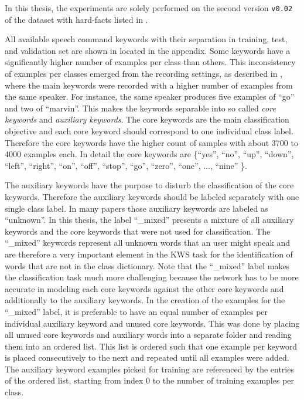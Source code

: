 In this thesis, the experiments are solely performed on the second version \texttt{v0.02} of the dataset with hard-facts listed in .

All available speech command keywords with their separation in training, test, and validation set are shown in  located in the appendix.
Some keywords have a significantly higher number of examples per class than others.
This inconsistency of examples per classes emerged from the recording settings, as described in \cite{Warden2018}, where the main keywords were recorded with a higher number of examples from the same speaker.
For instance, the same speaker produces five examples of \enquote{go} and two of \enquote{marvin}.
This makes the keywords separable into so called \emph{core keywords} and \emph{auxiliary keywords}.
The core keywords are the main classification objective and each core keyword should correspond to one individual class label.
Therefore the core keywords have the higher count of samples with about 3700 to 4000 examples each.
In detail the core keywords are \{\enquote{yes}, \enquote{no}, \enquote{up}, \enquote{down}, \enquote{left}, \enquote{right}, \enquote{on}, \enquote{off}, \enquote{stop}, \enquote{go}, \enquote{zero}, \enquote{one}, ..., \enquote{nine} \}.

The auxiliary keywords have the purpose to disturb the classification of the core keywords.
Therefore the auxiliary keywords should be labeled separately with one single class label.
In many papers those auxiliary keywords are labeled as \enquote{unknown}.
In this thesis, the label \enquote{\_mixed} presents a mixture of all auxiliary keywords and the core keywords that were not used for classification.
The \enquote{\_mixed} keywords represent all unknown words that an user might speak and are therefore a very important element in the KWS task for the identification of words that are not in the class dictionary.
Note that the \enquote{\_mixed} label makes the classification task much more challenging because the network has to be more accurate in modeling each core keywords against the other core keywords and additionally to the auxiliary keywords.
In the creation of the examples for the \enquote{\_mixed} label, it is preferable to have an equal number of examples per individual auxiliary keyword and unused core keywords.
This was done by placing all unused core keywords and auxiliary words into a separate folder and reading them into an ordered list.
This list is ordered such that one example per keyword is placed consecutively to the next and repeated until all examples were added.
The auxiliary keyword examples picked for training are referenced by the entries of the ordered list, starting from index 0 to the number of training examples per class.

